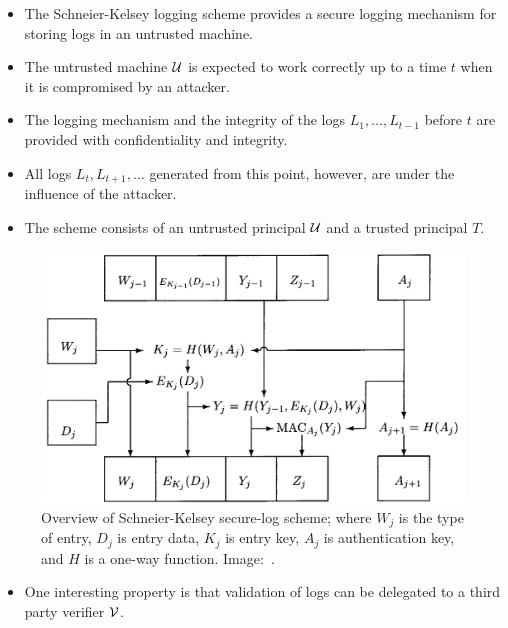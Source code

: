 \begin{frame}
  \begin{itemize}
    \item The Schneier-Kelsey logging scheme provides a secure logging 
      mechanism for storing logs in an untrusted machine.

    \item The untrusted machine \(\operatorname{\mathcal{U}}\) is expected to work correctly up to 
      a time \(t\) when it is compromised by an attacker.

    \item The logging mechanism and the integrity of the logs \(L_1, \ldots, 
      L_{t-1}\) before \(t\) are provided with confidentiality and integrity.

    \item All logs \(L_t, L_{t+1}, \ldots\) generated from this point, however, 
      are under the influence of the attacker.

  \end{itemize}
\end{frame}

\begin{frame}
  \begin{itemize}
    \item The scheme consists of an untrusted principal \(\operatorname{\mathcal{U}}\) and a trusted 
      principal \(T\).

  \end{itemize}
\end{frame}

\begin{frame}
  \begin{figure}
    \includegraphics[height=0.7\textheight]{seclog.png}
    \caption{%
      Overview of Schneier-Kelsey secure-log scheme; where \(W_j\) is the type 
      of entry, \(D_j\) is entry data, \(K_j\) is entry key, \(A_j\) is 
      authentication key, and \(H\) is a one-way function.
      Image:~\cite{schneier1999secure}.
    }
  \end{figure}
\end{frame}

\begin{frame}
  \begin{itemize}
    \item One interesting property is that validation of logs can be delegated 
      to a third party verifier \(\operatorname{\mathcal{V}}\).
  \end{itemize}
\end{frame}



\begin{frame}
  \small
  \printbibliography{}
\end{frame}


